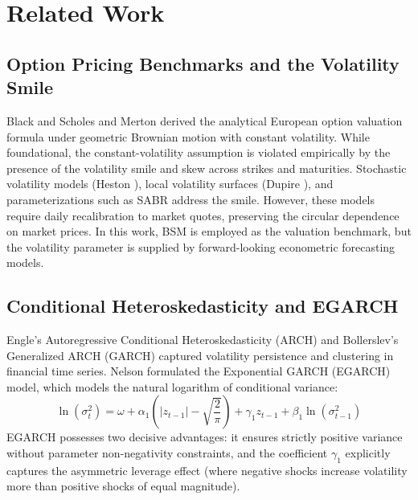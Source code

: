 \documentclass[journal]{IEEEtran}
\begin{document}
\section{Related Work}

\subsection{Option Pricing Benchmarks and the Volatility Smile}
Black and Scholes \cite{black1973} and Merton \cite{merton1973} derived the analytical European option valuation formula under geometric Brownian motion with constant volatility. While foundational, the constant-volatility assumption is violated empirically by the presence of the volatility smile and skew across strikes and maturities. Stochastic volatility models (Heston \cite{heston1993}), local volatility surfaces (Dupire \cite{dupire1994}), and parameterizations such as SABR \cite{sabr2002} address the smile. However, these models require daily recalibration to market quotes, preserving the circular dependence on market prices. In this work, BSM is employed as the valuation benchmark, but the volatility parameter is supplied by forward-looking econometric forecasting models.

\subsection{Conditional Heteroskedasticity and EGARCH}
Engle's Autoregressive Conditional Heteroskedasticity (ARCH) \cite{engle1982} and Bollerslev's Generalized ARCH (GARCH) \cite{bollerslev1986} captured volatility persistence and clustering in financial time series. Nelson \cite{nelson1991} formulated the Exponential GARCH (EGARCH) model, which models the natural logarithm of conditional variance:
\begin{equation}
\ln(\sigma_t^2) = \omega + \alpha_1 \left( |z_{t-1}| - \sqrt{\frac{2}{\pi}} \right) + \gamma_1 z_{t-1} + \beta_1 \ln(\sigma_{t-1}^2)
\end{equation}
EGARCH possesses two decisive advantages: it ensures strictly positive variance without parameter non-negativity constraints, and the coefficient $\gamma_1$ explicitly captures the asymmetric leverage effect (where negative shocks increase volatility more than positive shocks of equal magnitude).
\end{document}
